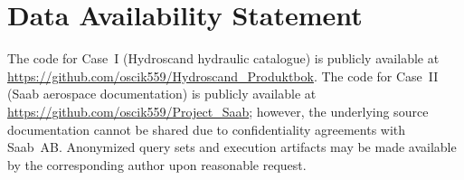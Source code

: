\documentclass[largeformat]{interact}
\begin{document}
\section*{Data Availability Statement}
\noindent The code for Case~I (Hydroscand hydraulic catalogue) is publicly available at \url{https://github.com/oscik559/Hydroscand_Produktbok}. The code for Case~II (Saab aerospace documentation) is publicly available at \url{https://github.com/oscik559/Project_Saab}; however, the underlying source documentation cannot be shared due to confidentiality agreements with Saab~AB. Anonymized query sets and execution artifacts may be made available by the corresponding author upon reasonable request.


\clearpage
\appendix
\renewcommand{\thesection}{\Alph{section}}
\renewcommand{\thesubsection}{\thesection.\arabic{subsection}}
\renewcommand{\thetable}{\thesection.\arabic{table}}
\setcounter{section}{0}

\newpage
\end{document}
